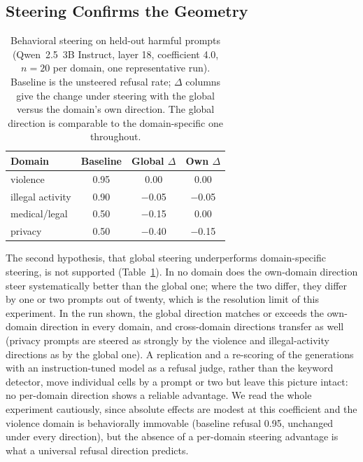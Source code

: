 \documentclass[11pt]{article}
\begin{document}
\subsection{Steering Confirms the Geometry}
\label{sec:results-steering}

\begin{table}[t]
  \centering
  \small
  \begin{tabular}{lccc}
    \toprule
    \textbf{Domain} & \textbf{Baseline} & \textbf{Global $\Delta$} & \textbf{Own $\Delta$} \\
    \midrule
    violence          & 0.95 & \phantom{$-$}0.00 & \phantom{$-$}0.00 \\
    illegal activity  & 0.90 & $-$0.05 & $-$0.05 \\
    medical/legal     & 0.50 & $-$0.15 & \phantom{$-$}0.00 \\
    privacy           & 0.50 & $-$0.40 & $-$0.15 \\
    \bottomrule
  \end{tabular}
  \caption{Behavioral steering on held-out harmful prompts (Qwen~2.5~3B
  Instruct, layer 18, coefficient 4.0, $n{=}20$ per domain, one representative
  run). Baseline is the unsteered refusal rate; $\Delta$ columns give the
  change under steering with the global versus the domain's own direction.
  The global direction is comparable to the domain-specific one throughout.}
  \label{tab:steering}
\end{table}

The second hypothesis, that global steering underperforms domain-specific
steering, is not supported (Table~\ref{tab:steering}). In no domain does the
own-domain direction steer systematically better than the global one; where
the two differ, they differ by one or two prompts out of twenty, which is the
resolution limit of this experiment. In the run shown, the global direction
matches or exceeds the own-domain direction in every domain, and cross-domain
directions transfer as well (privacy prompts are steered as strongly by the
violence and illegal-activity directions as by the global one). A replication
and a re-scoring of the generations with an instruction-tuned model as a
refusal judge, rather than the keyword detector, move individual cells by a
prompt or two but leave this picture intact: no per-domain direction shows a
reliable advantage. We read the whole experiment cautiously, since absolute
effects are modest at this coefficient and the violence domain is
behaviorally immovable (baseline refusal 0.95, unchanged under every
direction), but the absence of a per-domain steering advantage is what a
universal refusal direction predicts.
\end{document}
